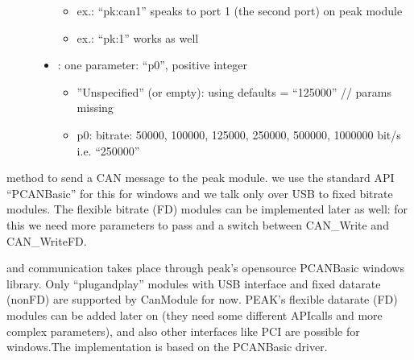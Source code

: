 \documentclass[a4paper,10pt,english]{sphinxmanual}
\begin{document}
\begin{fulllineitems}
\begin{fulllineitems}
\begin{description}
\begin{itemize}
\begin{itemize}
\item {} 
ex.: “pk:can1” speaks to port 1 (the second port) on peak module

\item {} 
ex.: “pk:1” works as well

\end{itemize}


\item {} 
: one parameter: “p0”, positive integer\begin{itemize}
\item {} 
”Unspecified” (or empty): using defaults = “125000” // params missing

\item {} 
p0: bitrate: 50000, 100000, 125000, 250000, 500000, 1000000 bit/s i.e. “250000”

\end{itemize}


\end{itemize}

\end{description}


\end{fulllineitems}


\begin{fulllineitems}
\label{\detokenize{vendors/peak:_CPPv4N9PKCanScan11sendMessageEshPhb}}%
\pysigstartmultiline
{}%
\pysigstopmultiline
method to send a CAN message to the peak module. we use the standard API “PCAN\sphinxhyphen{}Basic” for this for windows and we talk only over USB to fixed bitrate modules. The flexible bitrate (FD) modules can be implemented later as well: for this we need more parameters to pass and a switch between CAN\_Write and CAN\_WriteFD. 

\end{fulllineitems}


\end{fulllineitems}


and communication takes place through peak’s open\sphinxhyphen{}source PCAN\sphinxhyphen{}Basic windows library. Only “plug\sphinxhyphen{}and\sphinxhyphen{}play”
modules with USB interface and fixed datarate (non\sphinxhyphen{}FD) are supported by CanModule for now. PEAK’s flexible datarate (FD)
modules can be added later on (they need some different API\sphinxhyphen{}calls and more complex parameters), and also
other interfaces like PCI are possible for windows.The implementation is based on the PCAN\sphinxhyphen{}Basic driver.
\end{document}
